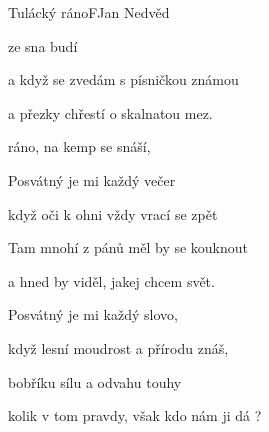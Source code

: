 \setcounter{page}{94}
\begin{song}{Tulácký ráno}{F}{Jan Nedvěd}

\begin{SBVerse}


 ze sna budí 

a když se zvedám s písničkou známou

a přezky chřestí o skalnatou mez.

\end{SBVerse}

\begin{SBChorus}

 ráno, na kemp se snáší,




\end{SBChorus}

\begin{SBVerse}

Posvátný je mi každý večer

když oči k ohni vždy vrací se zpět

Tam mnohí z pánů měl by se kouknout

a hned by viděl, jakej chcem svět.

\end{SBVerse}

\begin{SBVerse}

Posvátný je mi každý slovo,

když lesní moudrost a přírodu znáš,

bobříku sílu a odvahu touhy

kolik v tom pravdy, však kdo nám ji dá ?

\end{SBVerse}

\end{song}

\pagebreak
